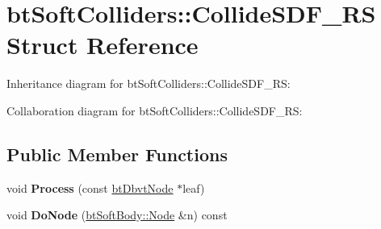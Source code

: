 \hypertarget{structbt_soft_colliders_1_1_collide_s_d_f___r_s}{\section{bt\+Soft\+Colliders\+:\+:Collide\+S\+D\+F\+\_\+\+R\+S Struct Reference}
\label{structbt_soft_colliders_1_1_collide_s_d_f___r_s}
}


Inheritance diagram for bt\+Soft\+Colliders\+:\+:Collide\+S\+D\+F\+\_\+\+R\+S\+:


Collaboration diagram for bt\+Soft\+Colliders\+:\+:Collide\+S\+D\+F\+\_\+\+R\+S\+:
\subsection*{Public Member Functions}
\begin{DoxyCompactItemize}
\item 
\hypertarget{structbt_soft_colliders_1_1_collide_s_d_f___r_s_a26a935dcb4fbad06d8fb0cb1c3db4add}{void {\bfseries Process} (const \hyperlink{structbt_dbvt_node}{bt\+Dbvt\+Node} $\ast$leaf)}\label{structbt_soft_colliders_1_1_collide_s_d_f___r_s_a26a935dcb4fbad06d8fb0cb1c3db4add}

\item 
\hypertarget{structbt_soft_colliders_1_1_collide_s_d_f___r_s_a693699b41ed7e488be74bf8b77234501}{void {\bfseries Do\+Node} (\hyperlink{structbt_soft_body_1_1_node}{bt\+Soft\+Body\+::\+Node} \&n) const }\label{structbt_soft_colliders_1_1_collide_s_d_f___r_s_a693699b41ed7e488be74bf8b77234501}

\end{DoxyCompactItemize}
